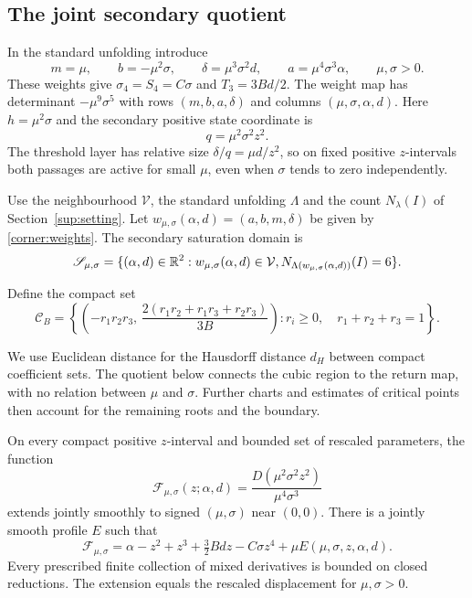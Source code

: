 \subsection{The joint secondary quotient}

In the standard unfolding introduce
\begin{equation}\label{corner:weights}
 m=\mu,\qquad b=-\mu^2\sigma,\qquad
 \delta=\mu^3\sigma^2d,\qquad a=\mu^4\sigma^3\alpha,
 \qquad \mu,\sigma>0.
\end{equation}
These weights give $\sigma_4=S_4=C\sigma$ and $T_3=3Bd/2$.
The weight map has determinant $-\mu^9\sigma^5$ with rows
$(m,b,a,\delta)$ and columns $(\mu,\sigma,\alpha,d)$.
Here $h=\mu^2\sigma$ and the secondary positive state coordinate is
\[
 q=\mu^2\sigma^2z^2.
\]
The threshold layer has relative size $\delta/q=\mu d/z^2$, so on fixed
positive $z$-intervals both passages are active for small $\mu$, even when
$\sigma$ tends to zero independently.

\begin{definition}
\label{def:actual-secondary-domain}
Use the neighbourhood $\mathcal V$, the standard unfolding $\Lambda$ and the
count $N_\lambda(I)$ of Section~\ref{sup:setting}.
Let $w_{\mu,\sigma}(\alpha,d)=(a,b,m,\delta)$ be given by
\eqref{corner:weights}. The secondary saturation domain is
\[
 \mathscr S_{\mu,\sigma}
 =\{(\alpha,d)\in\mathbb R^2:w_{\mu,\sigma}(\alpha,d)\in\mathcal V,
       N_{\Lambda(w_{\mu,\sigma}(\alpha,d))}(I)=6\}.
\]
\end{definition}

Define the compact set
\begin{equation}\label{corner:CB}
 \mathcal C_B=
 \left\{\left(-r_1r_2r_3,\,
       \frac{2(r_1r_2+r_1r_3+r_2r_3)}{3B}\right):
       r_i\geq0,\quad r_1+r_2+r_3=1\right\}.
\end{equation}

We use Euclidean distance for the Hausdorff distance $d_H$ between compact
coefficient sets. The quotient below connects the cubic region to the return
map, with no relation between $\mu$ and $\sigma$. Further charts and
estimates of critical points then account for the remaining roots and the
boundary.

\begin{lemma}
\label{corner:joint-quotient}
On every compact positive $z$-interval and bounded set of rescaled
parameters, the function
\[
 \mathcal F_{\mu,\sigma}(z;\alpha,d)
 =\frac{D(\mu^2\sigma^2z^2)}{\mu^4\sigma^3}
\]
extends jointly smoothly to signed $(\mu,\sigma)$ near $(0,0)$. There is a
jointly smooth profile $E$ such that
\begin{equation}\label{corner:joint-limit}
 \mathcal F_{\mu,\sigma}
 =\alpha-z^2+z^3+\tfrac32 Bdz-C\sigma z^4
       +\mu E(\mu,\sigma,z,\alpha,d).
\end{equation}
Every prescribed finite collection of mixed derivatives is bounded on
closed reductions. The extension equals the rescaled displacement for
$\mu,\sigma>0$.
\end{lemma}


